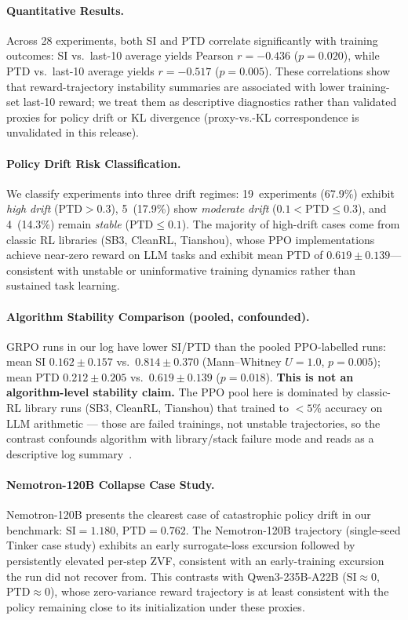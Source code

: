 \documentclass{article}
\begin{document}
\paragraph{Quantitative Results.}
Across 28 experiments, both SI and PTD correlate significantly with
training outcomes:
SI vs.\ last-10 average yields Pearson $r = -0.436$ ($p = 0.020$),
while PTD vs.\ last-10 average yields $r = -0.517$ ($p = 0.005$).
These correlations show that reward-trajectory instability summaries
are associated with lower training-set last-10 reward; we treat them
as descriptive diagnostics rather than validated proxies for policy
drift or KL divergence (proxy-vs.-KL correspondence is unvalidated
in this release).

\paragraph{Policy Drift Risk Classification.}
We classify experiments into three drift regimes:
19~experiments (67.9\%) exhibit \emph{high drift}
($\text{PTD} > 0.3$), 5~(17.9\%) show \emph{moderate drift}
($0.1 < \text{PTD} \leq 0.3$), and 4~(14.3\%) remain \emph{stable}
($\text{PTD} \leq 0.1$). The majority of high-drift cases come from
classic RL libraries (SB3, CleanRL, Tianshou), whose PPO
implementations achieve near-zero reward on LLM tasks and exhibit
mean PTD of $0.619 \pm 0.139$---consistent with unstable or uninformative
training dynamics rather than sustained task learning.

\paragraph{Algorithm Stability Comparison (pooled, confounded).}
GRPO runs in our log have lower SI/PTD than the pooled PPO-labelled
runs: mean SI $0.162 \pm 0.157$ vs.\ $0.814 \pm 0.370$
(Mann--Whitney $U = 1.0$, $p = 0.005$); mean PTD $0.212 \pm 0.205$
vs.\ $0.619 \pm 0.139$ ($p = 0.018$). \textbf{This is not an
algorithm-level stability claim.} The PPO pool here is dominated by
classic-RL library runs (SB3, CleanRL, Tianshou) that trained to
$<5\%$ accuracy on LLM arithmetic --- those are failed trainings, not
unstable trajectories, so the contrast confounds algorithm with
library/stack failure mode and reads as a
descriptive log summary~\citep{shao2024deepseekmath}.

\paragraph{Nemotron-120B Collapse Case Study.}
Nemotron-120B presents the clearest case of catastrophic policy drift
in our benchmark: $\text{SI} = 1.180$, $\text{PTD} = 0.762$.
The Nemotron-120B trajectory (single-seed Tinker case study)
exhibits an early surrogate-loss excursion followed by persistently elevated
per-step ZVF, consistent with an early-training excursion the run
did not recover from. This contrasts with Qwen3-235B-A22B
($\text{SI} \approx 0$, $\text{PTD} \approx 0$), whose zero-variance reward
trajectory is at least consistent with the policy remaining close to its
initialization under these proxies.
\end{document}
